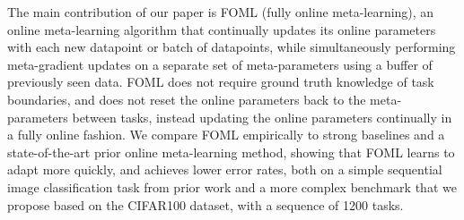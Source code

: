 The main contribution of our paper is FOML (fully online meta-learning), an online meta-learning algorithm that continually updates its online parameters with each new datapoint or batch of datapoints, while simultaneously performing meta-gradient updates on a separate set of meta-parameters using a buffer of previously seen data. FOML does not require ground truth knowledge of task boundaries, and does not reset the online parameters back to the meta-parameters between tasks, instead updating the online parameters continually in a fully online fashion. We compare FOML empirically to strong baselines and a state-of-the-art prior online meta-learning method, showing that FOML learns to adapt more quickly, and achieves lower error rates, both on a simple sequential image classification task from prior work and a more complex benchmark that we propose based on the CIFAR100 dataset, with a sequence of 1200 tasks.

